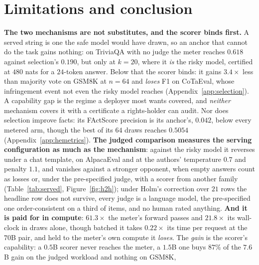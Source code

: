
\section{Limitations and conclusion}\label{sec:limitations}

\textbf{The two mechanisms are not substitutes, and the scorer binds first.} A served string is one the
safe model would have drawn, so an anchor that cannot do the task gains nothing: on TriviaQA
\citep{joshi2017triviaqa} with no judge the meter reaches $0.618$ against selection's $0.190$, but only at
$k=20$, where it \emph{is} the risky model, certified at $480$ nats for a $24$-token answer. Below that the
scorer binds: it gains $3.4\times$ less than majority vote on GSM8K at $n=64$ and \emph{loses} F1 on
CoTaEval, whose infringement event not even the risky model reaches (Appendix~\ref{app:selection}). A
capability gap is the regime a deployer most wants covered, and \emph{neither} mechanism covers it with a
certificate a rights-holder can audit. Nor
does selection improve facts: its FActScore precision is its anchor's, $0.042$, below every metered arm,
though the best of its $64$ draws reaches $0.5054$ (Appendix~\ref{app:hemetrics}). \textbf{The judged
comparison measures the serving configuration as much as the mechanism}: against the risky model it
reverses under a chat template, on AlpacaEval \citep{li2023alpacaeval} and at the authors' temperature $0.7$
and penalty $1.1$, and vanishes against a stronger opponent, when empty answers count as losses or, under the
pre-specified judge, with a scorer from another family (Table~\ref{tab:served}, Figure~\ref{fig:h2h}); under Holm's correction over $21$
rows the headline row does not survive, every judge is a language model, the pre-specified one
order-consistent on a third of items, and no human rated anything. \textbf{And it is paid for in compute}:
$61.3\times$ the meter's forward passes and $21.8\times$ its wall-clock in draws alone, though batched it takes $0.22\times$ its time per request at the $70$B pair, and held to the
meter's own compute it \emph{loses}. The \emph{gain} is the scorer's capability: a $0.5$B scorer never
reaches the meter, a $1.5$B one buys $87\%$ of the $7.6$B gain on the judged workload and nothing on GSM8K,
